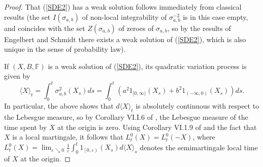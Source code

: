 \documentclass[reqno]{amsart}
\theoremstyle{definition}
\theoremstyle{remark}
\numberwithin{equation}{section}
\begin{document}
\begin{proof}
That (\ref{SDE2}) has a weak solution follows immediately from classical results (the set $I(\sigma_{a,b})$ of non-local integrability of $\sigma_{a,b}^{-2}$ is in this case empty, and coincides with the set $Z(\sigma_{a,b})$ of zeroes of $\sigma_{a,b}$, so by the results of Engelbert and Schmidt \cite{Engelbert-Schmidt} there exists a weak solution of (\ref{SDE2}), which is also unique in the sense of probability law).

If $(X,B,\mathbb{F})$ is a weak solution of (\ref{SDE2}), its quadratic variation process is given by
\[
\langle X\rangle _{t}=\int_{0}^{t}\sigma _{a,b}^{2}\left( X_{s}\right)
ds=\int_{0}^{t}\left (a^{2}1_{[0,\infty )}\left( X_{s}\right) +b^{2}1_{(-\infty
,0)}\left( X_{s}\right)\right) ds.
\]
In particular, the above shows that $d\langle X\rangle _{t}$ is absolutely continuous with
respect to the Lebesgue measure, so by Corollary VI.I.6 of \cite{Revuz and Yor}, the Lebesgue measure of the time spent by $X$ at the origin is zero. Using Corollary VI.1.9 of \cite{Revuz and Yor} and the fact that $X$ is a local martingale, it follows that $L_t^0(X)=L_t^0(-X)$, where $L_{t}^{0}\left( X\right) =\lim_{\varepsilon \searrow 0}\frac{1}{\varepsilon }\int_{0}^{t}1_{\left[0 ,\varepsilon \right)}\left( X_{s}\right) d\langle X\rangle _{s}$ denotes the semimartingale local time of $X$ at the origin.


\end{proof}
\end{document}
